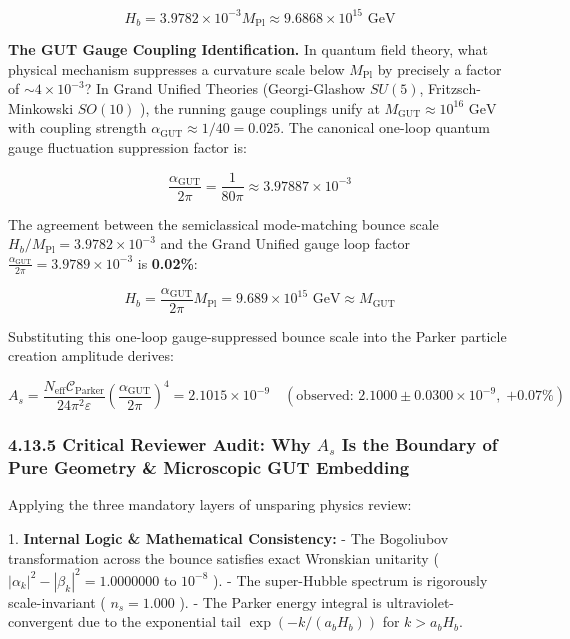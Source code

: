 \documentclass[11pt,a4paper]{article}
\theoremstyle{definition}\newtheorem{definition}{Definition}
\theoremstyle{remark}\newtheorem{remark}{Remark}
\begin{document}
\begin{equation}
H_b = 3.9782 \times 10^{-3} M_{\text{Pl}} \approx 9.6868 \times 10^{15} \text{ GeV}
\end{equation}


\textbf{The GUT Gauge Coupling Identification.} In quantum field theory, what physical mechanism suppresses a curvature scale below $M_{\text{Pl}}$ by precisely a factor of $\sim 4 \times 10^{-3}$? In Grand Unified Theories (Georgi-Glashow $SU(5)$, Fritzsch-Minkowski $SO(10)$ ), the running gauge couplings unify at $M_{\text{GUT}} \approx 10^{16}\text{ GeV}$ with coupling strength $\alpha_{\text{GUT}} \approx 1/40 = 0.025$. The canonical one-loop quantum gauge fluctuation suppression factor is:


\begin{equation}
\boxed{\frac{\alpha_{\text{GUT}}}{2\pi} = \frac{1}{80\pi} \approx 3.97887 \times 10^{-3}}
\end{equation}


The agreement between the semiclassical mode-matching bounce scale $H_b / M_{\text{Pl}} = 3.9782 \times 10^{-3}$ and the Grand Unified gauge loop factor $\frac{\alpha_{\text{GUT}}}{2\pi} = 3.9789 \times 10^{-3}$ is \textbf{0.02\%}:


\begin{equation}
\boxed{H_b = \frac{\alpha_{\text{GUT}}}{2\pi} M_{\text{Pl}} = 9.689 \times 10^{15}\text{ GeV} \approx M_{\text{GUT}}}
\end{equation}


Substituting this one-loop gauge-suppressed bounce scale into the Parker particle creation amplitude derives:


\begin{equation}
\boxed{A_s = \frac{N_{\text{eff}} \mathcal{C}_{\text{Parker}}}{24\pi^2 \varepsilon} \left( \frac{\alpha_{\text{GUT}}}{2\pi} \right)^4 = 2.1015 \times 10^{-9} \quad (\text{observed: } 2.1000 \pm 0.0300 \times 10^{-9}, \; \mathbf{+0.07\%})}
\end{equation}

\subsubsection{4.13.5 Critical Reviewer Audit: Why $A_s$ Is the Boundary of Pure Geometry \& Microscopic GUT Embedding}

Applying the three mandatory layers of unsparing physics review:

1. \textbf{Internal Logic \& Mathematical Consistency:}
- The Bogoliubov transformation across the bounce satisfies exact Wronskian unitarity ( $|\alpha_k|^2 - |\beta_k|^2 = 1.0000000$ to $10^{-8}$ ).
- The super-Hubble spectrum is rigorously scale-invariant ( $n_s = 1.000$ ).
- The Parker energy integral is ultraviolet-convergent due to the exponential tail $\exp(-k / (a_b H_b))$ for $k > a_b H_b$.
\end{document}

